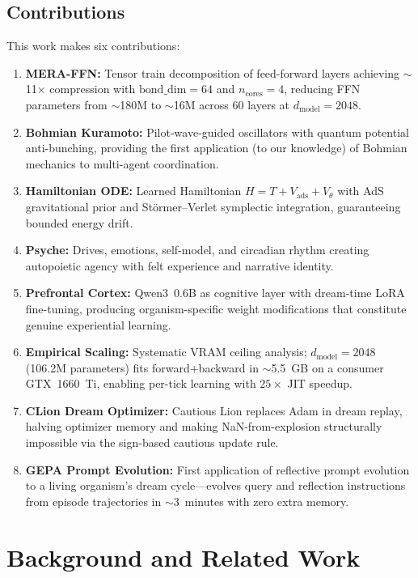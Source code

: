 \documentclass[11pt,a4paper,twocolumn]{article}
\begin{document}
\subsection{Contributions}

This work makes six contributions:
\begin{enumerate}
\item \textbf{MERA-FFN:} Tensor train decomposition of feed-forward layers achieving $\sim$11$\times$ compression with $\mathrm{bond\_dim}=64$ and $n_{\mathrm{cores}}=4$, reducing FFN parameters from $\sim$180M to $\sim$16M across 60 layers at $d_{\mathrm{model}}=2048$.
\item \textbf{Bohmian Kuramoto:} Pilot-wave-guided oscillators with quantum potential anti-bunching, providing the first application (to our knowledge) of Bohmian mechanics to multi-agent coordination.
\item \textbf{Hamiltonian ODE:} Learned Hamiltonian $H=T+V_{\mathrm{ads}}+V_\theta$ with AdS gravitational prior and St\"ormer--Verlet symplectic integration, guaranteeing bounded energy drift.
\item \textbf{Psyche:} Drives, emotions, self-model, and circadian rhythm creating autopoietic agency with felt experience and narrative identity.
\item \textbf{Prefrontal Cortex:} Qwen3~0.6B as cognitive layer with dream-time LoRA fine-tuning, producing organism-specific weight modifications that constitute genuine experiential learning.
\item \textbf{Empirical Scaling:} Systematic VRAM ceiling analysis; $d_{\mathrm{model}}=2048$ (106.2M parameters) fits forward+backward in $\sim$5.5~GB on a consumer GTX~1660~Ti, enabling per-tick learning with $25\times$ JIT speedup.
\item \textbf{CLion Dream Optimizer:} Cautious Lion replaces Adam in dream replay, halving optimizer memory and making NaN-from-explosion structurally impossible via the sign-based cautious update rule.
\item \textbf{GEPA Prompt Evolution:} First application of reflective prompt evolution to a living organism's dream cycle---evolves query and reflection instructions from episode trajectories in ${\sim}3$~minutes with zero extra memory.
\end{enumerate}

\section{Background and Related Work}
\end{document}
